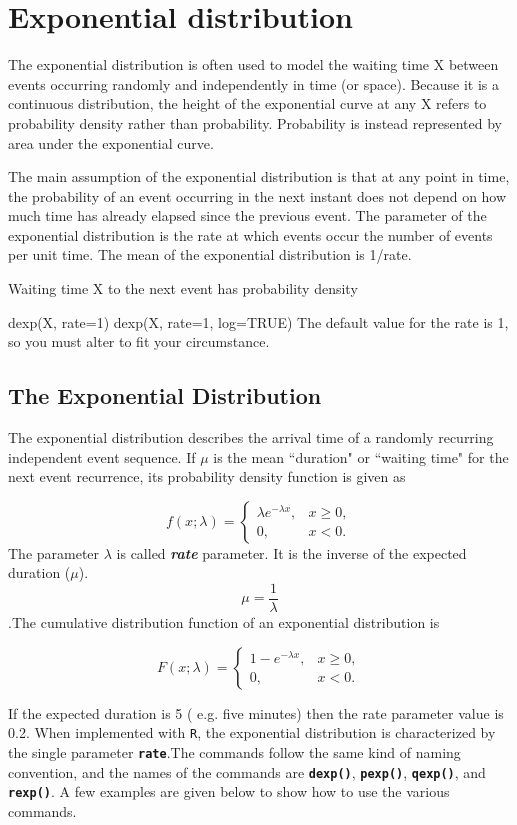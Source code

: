 \newpage
\section{Exponential distribution}
The exponential distribution is often used to model the waiting time X between events occurring randomly and independently in time (or space). Because it is a continuous distribution, the height of the exponential curve at any X refers to probability density rather than probability. Probability is instead represented by area under the exponential curve.

The main assumption of the exponential distribution is that at any point in time, the probability of an event occurring in the next instant does not depend on how much time has already elapsed since the previous event. The parameter of the exponential distribution is the rate at which events occur  the number of events per unit time. The mean of the exponential distribution is 1/rate.

Waiting time X to the next event has probability density

dexp(X, rate=1)
dexp(X, rate=1, log=TRUE)
The default value for the rate is 1, so you must alter to fit your circumstance.

\subsection{The Exponential Distribution}


The exponential distribution describes the arrival time of a randomly recurring independent event sequence. If $\mu$ is the mean ``duration" or ``waiting time" for the next event recurrence, its probability density function is given as

\[f(x;\lambda) = \begin{cases}
\lambda e^{-\lambda x}, & x \ge 0, \\
0, & x < 0.
\end{cases}\]
The parameter $\lambda$  is called \textbf{\emph{rate}} parameter. It is the inverse of the expected duration ($\mu$).\\
\[\mu= \frac{1}{\lambda}\].The cumulative distribution function of an exponential distribution is

\[
F(x;\lambda) = \begin{cases}
1-e^{-\lambda x}, & x \ge 0, \\
0, & x < 0.
\end{cases}\]

If the expected duration is 5 ( e.g. five minutes) then the rate parameter value is 0.2. When implemented with \texttt{R}, the exponential distribution is characterized by the single parameter \texttt{\textbf{rate}}.The commands follow the same kind of naming convention, and the names of the commands are \texttt{\textbf{dexp()}}, \texttt{\textbf{pexp()}}, \texttt{\textbf{qexp()}}, and \texttt{\textbf{rexp()}}. A few examples are given below to show how to use the various commands. 

